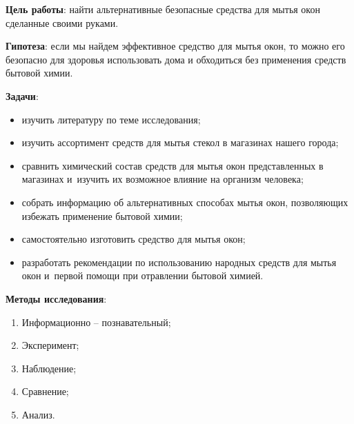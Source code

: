 \bigskip
{}



\makeProcTitleSchool


\textbf{Цель работы}: найти альтернативные безопасные средства для мытья окон сделанные своими руками.

\textbf{Гипотеза}: если мы найдем эффективное средство для мытья окон, то можно его безопасно для здоровья использовать дома и обходиться без применения средств бытовой химии.

\textbf{Задачи}:

\begin{itemize}[noitemsep]\vspace{-8pt}
\item изучить литературу по теме исследования;
\item изучить ассортимент средств для мытья стекол в магазинах нашего города;
\item сравнить химический состав средств для мытья окон представленных в магазинах и~изучить их возможное влияние на организм человека;
\item собрать информацию об альтернативных способах мытья окон, позволяющих избежать применение бытовой химии;
\item самостоятельно изготовить средство для мытья окон;
\item разработать рекомендации по использованию народных средств для мытья окон и~первой помощи при отравлении бытовой химией.
\end{itemize}\vspace{-8pt}

\textbf{Методы исследования}:

\begin{enumerate}[noitemsep]\vspace{-8pt}
\item Информационно – познавательный;
\item Эксперимент;
\item Наблюдение;
\item Сравнение;
\item Анализ.
\end{enumerate}\vspace{-8pt}

